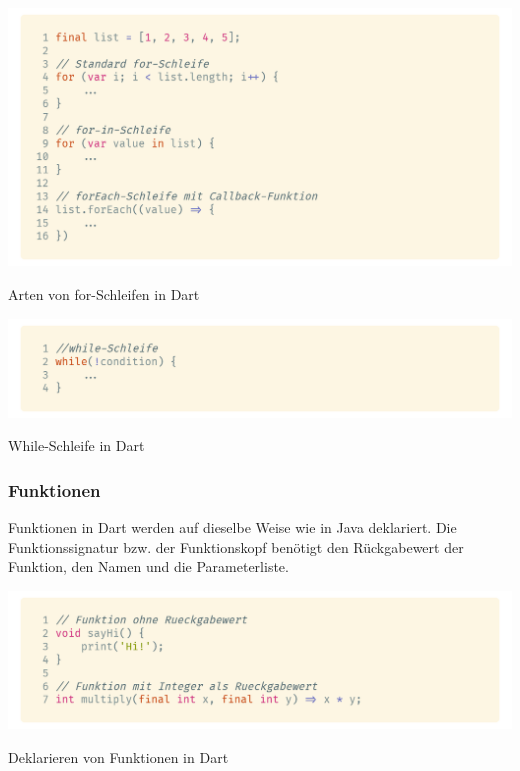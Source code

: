 \begin{code}[h]
    \centering
    \includegraphics[width=1\textwidth]{images/Dart/theory/dartForLoop.png}
    \caption{Arten von for-Schleifen in Dart}
\end{code}

\begin{code}[h]
    \centering
    \includegraphics[width=1\textwidth]{images/Dart/theory/dartWhileLoops.png}
    \caption{While-Schleife in Dart}
\end{code}

\newpage

\subsubsection{Funktionen}

Funktionen in Dart werden auf dieselbe Weise wie in Java deklariert. Die Funktionssignatur bzw. der Funktionskopf benötigt den Rückgabewert der Funktion, den Namen und die Parameterliste.

\begin{code}[h]
    \centering
    \includegraphics[width=1\textwidth]{images/Dart/theory/dartFunctions.png}
    \caption{Deklarieren von Funktionen in Dart}
\end{code}

